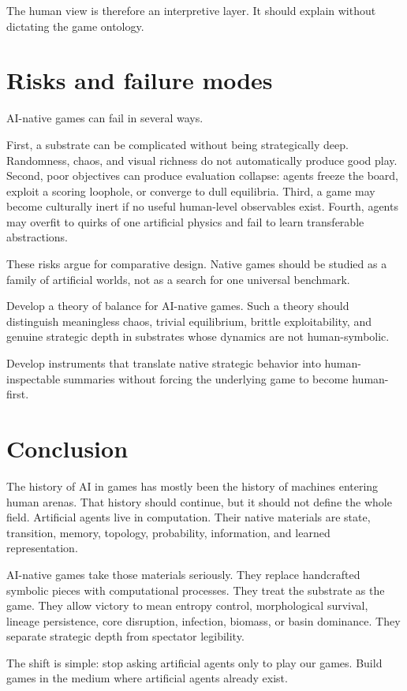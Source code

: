 The human view is therefore an interpretive layer. It should explain without dictating the game ontology.

\section{Risks and failure modes}\label{sec:risks}

AI-native games can fail in several ways.

First, a substrate can be complicated without being strategically deep. Randomness, chaos, and visual richness do not automatically produce good play. Second, poor objectives can produce evaluation collapse: agents freeze the board, exploit a scoring loophole, or converge to dull equilibria. Third, a game may become culturally inert if no useful human-level observables exist. Fourth, agents may overfit to quirks of one artificial physics and fail to learn transferable abstractions.

These risks argue for comparative design. Native games should be studied as a family of artificial worlds, not as a search for one universal benchmark.

\begin{problem}\label{prob:native-balance}
Develop a theory of balance for AI-native games. Such a theory should distinguish meaningless chaos, trivial equilibrium, brittle exploitability, and genuine strategic depth in substrates whose dynamics are not human-symbolic.
\end{problem}

\begin{problem}\label{prob:native-interpretability}
Develop instruments that translate native strategic behavior into human-inspectable summaries without forcing the underlying game to become human-first.
\end{problem}

\section{Conclusion}\label{sec:conclusion}

The history of AI in games has mostly been the history of machines entering human arenas. That history should continue, but it should not define the whole field. Artificial agents live in computation. Their native materials are state, transition, memory, topology, probability, information, and learned representation.

AI-native games take those materials seriously. They replace handcrafted symbolic pieces with computational processes. They treat the substrate as the game. They allow victory to mean entropy control, morphological survival, lineage persistence, core disruption, infection, biomass, or basin dominance. They separate strategic depth from spectator legibility.

The shift is simple: stop asking artificial agents only to play our games. Build games in the medium where artificial agents already exist.

\endgroup
